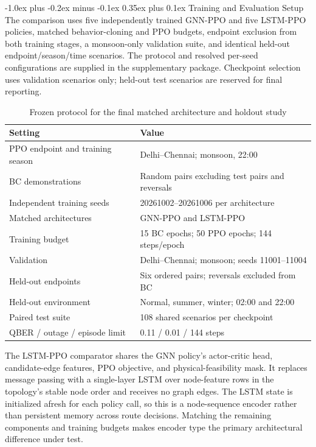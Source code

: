 \documentclass[journal]{IEEEtran}
\makeatletter
\def\subsubsection{\@startsection{subsubsection}{3}{\z@}%
  {-1.0ex plus -0.2ex minus -0.1ex}%
  {0.35ex plus 0.1ex}%
  {\normalfont\bfseries\itshape\fontsize{9.5}{11}\selectfont}}
\makeatother
\begin{document}
\subsubsection{Training and Evaluation Setup}
The comparison uses five independently trained GNN-PPO and five LSTM-PPO policies, matched behavior-cloning and PPO budgets, endpoint exclusion from both training stages, a monsoon-only validation suite, and identical held-out endpoint/season/time scenarios. The protocol and resolved per-seed configurations are supplied in the supplementary package. Checkpoint selection uses validation scenarios only; held-out test scenarios are reserved for final reporting.

\begin{table}[t]
\caption{Frozen protocol for the final matched architecture and holdout study}
\label{tab:scenario}
\centering
\scriptsize
\begin{tabular}{p{}p{}}
\toprule
Setting & Value\\
\midrule
PPO endpoint and training season & Delhi--Chennai; monsoon, 22:00\\
BC demonstrations & Random pairs excluding test pairs and reversals\\
Independent training seeds & 20261002--20261006 per architecture\\
Matched architectures & GNN-PPO and LSTM-PPO\\
Training budget & 15 BC epochs; 50 PPO epochs; 144 steps/epoch\\
Validation & Delhi--Chennai; monsoon; seeds 11001--11004\\
Held-out endpoints & Six ordered pairs; reversals excluded from BC\\
Held-out environment & Normal, summer, winter; 02:00 and 22:00\\
Paired test suite & 108 shared scenarios per checkpoint\\
QBER / outage / episode limit & 0.11 / 0.01 / 144 steps\\
\bottomrule
\end{tabular}
\end{table}

The LSTM-PPO comparator shares the GNN policy's actor-critic head, candidate-edge features, PPO objective, and physical-feasibility mask. It replaces message passing with a single-layer LSTM over node-feature rows in the topology's stable node order and receives no graph edges. The LSTM state is initialized afresh for each policy call, so this is a node-sequence encoder rather than persistent memory across route decisions. Matching the remaining components and training budgets makes encoder type the primary architectural difference under test.
\end{document}
